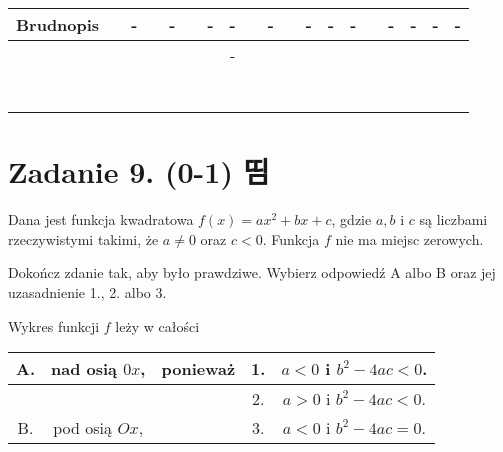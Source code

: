 \documentclass[10pt]{article}
\begin{document}
\begin{center}
\begin{tabular}{|c|c|c|c|c|c|c|c|c|c|c|c|c|c|c|c|c|c|c|c|c|c|c|}
\hline
\multicolumn{5}{|l|}{Brudnopis} &  & - &  & - &  & - & - &  & - &  & - & - & - &  & - & - & - & - \\
\hline
 &  &  &  &  &  &  &  &  &  &  & - &  &  &  &  &  &  &  &  &  &  &  \\
\hline
 &  &  &  &  &  &  &  &  &  &  &  &  &  &  &  &  &  &  &  &  &  &  \\
\hline
 &  &  &  &  &  &  &  &  &  &  &  &  &  &  &  &  &  &  &  &  &  &  \\
\hline
 &  &  &  &  &  &  &  &  &  &  &  &  &  &  &  &  &  &  &  &  &  &  \\
\hline
 &  &  &  &  &  &  &  &  &  &  &  &  &  &  &  &  &  &  &  &  &  &  \\
\hline
 &  &  &  &  &  &  &  &  &  &  &  &  &  &  &  &  &  &  &  &  &  &  \\
\hline
 &  &  &  &  &  &  &  &  &  &  &  &  &  &  &  &  &  &  &  &  &  &  \\
\hline
 &  &  &  &  &  &  &  &  &  &  &  &  &  &  &  &  &  &  &  &  &  &  \\
\hline
\end{tabular}
\end{center}

\section*{Zadanie 9. (0-1) 띰}
Dana jest funkcja kwadratowa \(f(x)=a x^{2}+b x+c\), gdzie \(a, b\) i \(c\) są liczbami rzeczywistymi takimi, że \(a \neq 0\) oraz \(c<0\). Funkcja \(f\) nie ma miejsc zerowych.

Dokończ zdanie tak, aby było prawdziwe. Wybierz odpowiedź A albo B oraz jej uzasadnienie 1., 2. albo 3.

Wykres funkcji \(f\) leży w całości

\begin{center}
\begin{tabular}{|c|c|c|c|c|}
\hline
\multirow{2}{*}{A.} & \multirow{2}{*}{nad osią \(0 x\),} & \multirow{3}{*}{ponieważ} & 1. & \(a<0\) i \(b^{2}-4 a c<0\). \\
\hline
 &  &  & 2. & \(a>0\) i \(b^{2}-4 a c<0\). \\
\hline
B. & pod osią \(O x\), &  & 3. & \(a<0\) i \(b^{2}-4 a c=0\). \\
\hline
\end{tabular}
\end{center}
\end{document}
